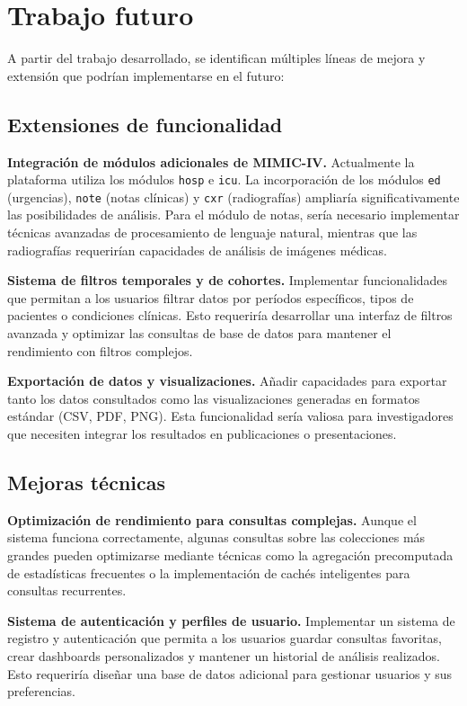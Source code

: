 \section{Trabajo futuro}

A partir del trabajo desarrollado, se identifican múltiples líneas de mejora y extensión que podrían implementarse en el futuro:

\subsection{Extensiones de funcionalidad}

\textbf{Integración de módulos adicionales de MIMIC-IV.} Actualmente la plataforma utiliza los módulos \texttt{hosp} e \texttt{icu}. La incorporación de los módulos \texttt{ed} (urgencias), \texttt{note} (notas clínicas) y \texttt{cxr} (radiografías) ampliaría significativamente las posibilidades de análisis. Para el módulo de notas, sería necesario implementar técnicas avanzadas de procesamiento de lenguaje natural, mientras que las radiografías requerirían capacidades de análisis de imágenes médicas.

\textbf{Sistema de filtros temporales y de cohortes.} Implementar funcionalidades que permitan a los usuarios filtrar datos por períodos específicos, tipos de pacientes o condiciones clínicas. Esto requeriría desarrollar una interfaz de filtros avanzada y optimizar las consultas de base de datos para mantener el rendimiento con filtros complejos.

\textbf{Exportación de datos y visualizaciones.} Añadir capacidades para exportar tanto los datos consultados como las visualizaciones generadas en formatos estándar (CSV, PDF, PNG). Esta funcionalidad sería valiosa para investigadores que necesiten integrar los resultados en publicaciones o presentaciones.

\subsection{Mejoras técnicas}

\textbf{Optimización de rendimiento para consultas complejas.} Aunque el sistema funciona correctamente, algunas consultas sobre las colecciones más grandes pueden optimizarse mediante técnicas como la agregación precomputada de estadísticas frecuentes o la implementación de cachés inteligentes para consultas recurrentes.

\textbf{Sistema de autenticación y perfiles de usuario.} Implementar un sistema de registro y autenticación que permita a los usuarios guardar consultas favoritas, crear dashboards personalizados y mantener un historial de análisis realizados. Esto requeriría diseñar una base de datos adicional para gestionar usuarios y sus preferencias.

